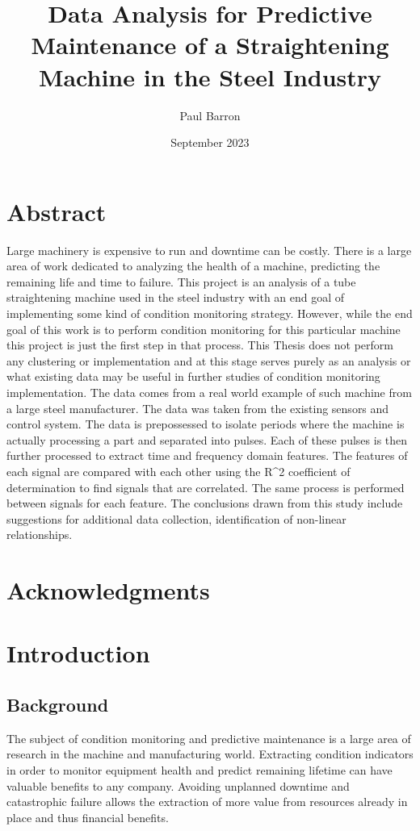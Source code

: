 \documentclass{article}
\title{Data Analysis for Predictive Maintenance of a Straightening Machine in the Steel Industry}
\date{September 2023}
\author{Paul Barron}
\begin{document}
\maketitle
\newpage
{}
\tableofcontents
\newpage
\section{Abstract}
Large machinery is expensive to run and downtime can be costly. 
There is a large area of work dedicated to analyzing the health of a machine, predicting the remaining life and time to failure.
This project is an analysis of a tube straightening machine used in the steel industry with an end goal of implementing some kind of condition monitoring strategy. However, while the end goal of this work is to perform condition monitoring for this particular machine this project is just the first step in that process. This Thesis does not perform any clustering or implementation and at this stage serves purely as an analysis or what existing data may be useful in further studies of condition monitoring implementation.
The data comes from a real world example of such machine from a large steel manufacturer. The data was taken from the existing sensors and control system.
The data is prepossessed to isolate periods where the machine is actually processing a part and separated into pulses. Each of these pulses is then further processed to extract time and frequency domain features. The features of each signal are compared with each other using the R^2 coefficient of determination to find signals that are correlated. The same process is performed between signals for each feature.
The conclusions drawn from this study include suggestions for additional data collection, identification of non-linear relationships.
\clearpage
\section{Acknowledgments}
\clearpage
\section{Introduction}
\subsection{Background}
The subject of condition monitoring and predictive maintenance is a large area of research in the machine and manufacturing world. Extracting condition indicators in order to monitor equipment health and predict remaining lifetime can have valuable benefits to any company. Avoiding unplanned downtime and catastrophic failure allows the extraction of more value from resources already in place and thus financial benefits.
\end{document}
